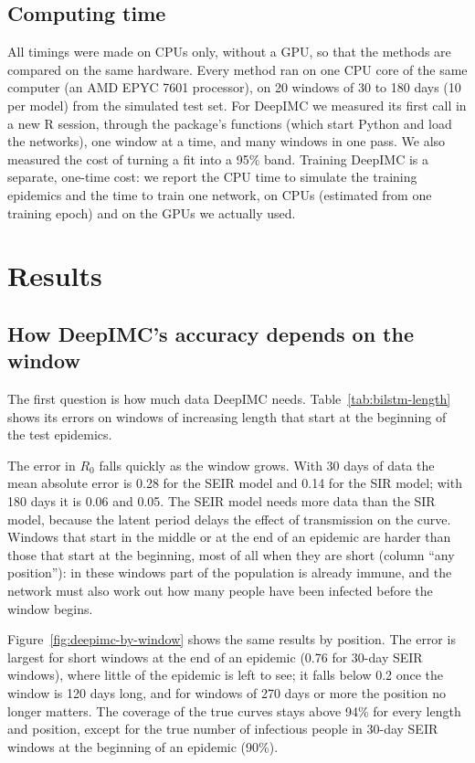 \documentclass[12pt]{article}
\begin{document}
\subsection{Computing time}\label{sec:eval-time}

All timings were made on CPUs only, without a GPU, so that the methods are compared on the same
hardware. Every method ran on one CPU core of the same computer (an AMD EPYC 7601 processor), on 20
windows of 30 to 180 days (10 per model) from the simulated test set. For DeepIMC we measured its first
call in a new R session, through the package's functions (which start Python and load the networks), one
window at a time, and many windows in one pass. We also measured
the cost of turning a fit into a 95\% band. Training DeepIMC is a separate, one-time cost: we report the
CPU time to simulate the training epidemics and the time to train one network, on CPUs (estimated from
one training epoch) and on the GPUs we actually used.

\section{Results}\label{sec:results}

\subsection{How DeepIMC's accuracy depends on the window}\label{sec:res-bilstm}

The first question is how much data DeepIMC needs. Table~\ref{tab:bilstm-length} shows its errors on
windows of increasing length that start at the beginning of the test epidemics.

The error in $R_0$ falls quickly as the window grows. With 30 days of data the mean absolute error is
0.28 for the SEIR model and 0.14 for the SIR model; with 180 days it is 0.06 and 0.05. The SEIR model
needs more data than the SIR model, because the latent period delays the effect of transmission on the
curve. Windows that start in the middle or at the end of an epidemic are harder than those that start at
the beginning, most of all when they are short (column ``any position''): in these windows part of the
population is already immune, and the network must also work out how many people have been infected
before the window begins.

Figure~\ref{fig:deepimc-by-window} shows the same results by position. The error is largest for short
windows at the end of an epidemic (0.76 for 30-day SEIR windows), where little of the epidemic is left to
see; it falls below 0.2 once the window is 120 days long, and for windows of 270 days or more the position no
longer matters. The coverage of the true curves stays above 94\% for every length and position, except for
the true number of infectious people in 30-day SEIR windows at the beginning of an epidemic (90\%).
\end{document}
